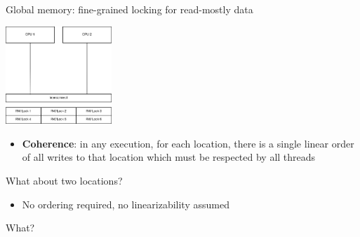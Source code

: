 \begin{frame}{Global memory: fine-grained locking for read-mostly data}

\begin{center}
  \includegraphics[width=0.3\textwidth]{./pics/processor/5.png}
\end{center}

\begin{itemize}
    \item \textbf{Coherence}: in any execution, for each location, there is a single linear order of all writes to that location which must be respected by all threads
\end{itemize}

\pause

What about two locations?
\pause
\begin{itemize}
    \item No ordering required, no linearizability assumed
\end{itemize}

\pause

What?

\end{frame}

